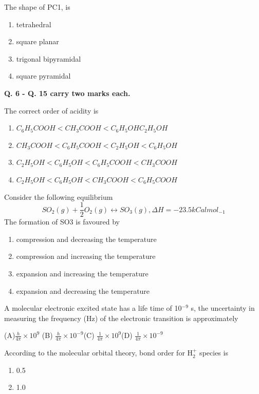 \documentclass[journal]{IEEEtran}
\begin{document}
\begin{enumerate}
{\begin{enumerate}
		\end{enumerate}

	\item{ The shape of PC1, is}
		\begin{enumerate}
			\item{ tetrahedral }
			\item{square planar }
			\item{trigonal bipyramidal}
			\item{square pyramidal}

		\end{enumerate}

	\textbf{Q. 6 - Q. 15 carry two marks each.}

	\item{ The correct order of acidity is}
		\begin{enumerate}
			\item{ $C_6H_5COOH < CH_3COOH < C_6H_5OH C_2H_5OH$}
		\item{$CH_3COOH < C_6H_5COOH < C_2H_5OH < C_6H_5OH$}
			\item{$C_2H_5OH < C_6H_5OH < C_6H_5COOH < CH_3COOH$}
			\item{$C_2H_5OH < C_6H_5OH< CH_3COOH < C_6H_5COOH$}

		\end{enumerate}

	\item{ Consider the following equilibrium \[ SO_2 (g) + \frac{1}{2} O_2 (g)\leftrightarrow SO_3 (g), \Delta H =-23.5 kCal mol_{-1} \]
		The formation of SO3 is favoured by}
		
		\begin{enumerate}
	\item{ compression and decreasing the temperature}

	\item{ compression and increasing the temperature}

	\item{ expansion and increasing the temperature }
	\item{ expansion and decreasing the temperature}
		\end{enumerate}

	\item {A molecular electronic excited state has a life time of 10$^{-9}$ s, the uncertainty in measuring the frequency (Hz) of the electronic transition is approximately}


		(A)$\frac{h}{4\pi} \times 10^{9}$ \hspace{10mm} (B) $\frac{h}{4\pi} \times 10^{-9}$\hspace{10mm}(C) $\frac{1}{4\pi} \times 10^{9}$\hspace{10mm}(D) $\frac{1}{4\pi} \times 10^{-9}$
	\item {According to the molecular orbital theory, bond order for H$_2^+$ species is}
	\begin{enumerate}
\item{ 0.5}
\item{ 1.0}


\end{enumerate}}
\end{enumerate}
\end{document}
